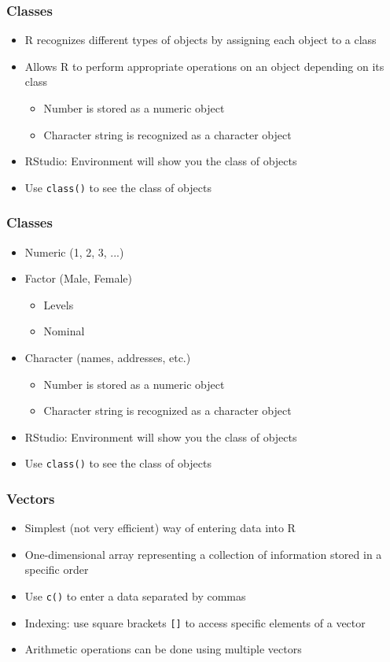 \documentclass{beamer}
\begin{document}
\begin{frame}
 \frametitle<+->{Classes}
 \begin{itemize}
   \item R recognizes different types of objects by assigning each object to a class
   \item Allows R to perform appropriate operations on an object depending on its class
     \begin{itemize}
       \item Number is stored as a numeric object
       \item Character string is recognized as a character object
     \end{itemize}
   \item RStudio: Environment will show you the class of objects
   \item Use {\tt class()} to see the class of objects
 \end{itemize}
\end{frame}

\begin{frame}
 \frametitle<+->{Classes}
 \begin{itemize}
   \item Numeric (1, 2, 3, ...)
   \item Factor (Male, Female)
    \begin{itemize}
       \item Levels
       \item Nominal
     \end{itemize}
   \item Character (names, addresses, etc.)
     \begin{itemize}
       \item Number is stored as a numeric object
       \item Character string is recognized as a character object
     \end{itemize}
   \item RStudio: Environment will show you the class of objects
   \item Use {\tt class()} to see the class of objects
 \end{itemize}
\end{frame}

\begin{frame}
 \frametitle<+->{Vectors}
 \begin{itemize}
   \item Simplest (not very efficient) way of entering data into R
   \item One-dimensional array representing a collection of information stored in a specific order
   \item Use {\tt c()} to enter a data separated by commas
   \item Indexing: use square brackets {\tt []} to access specific elements of a vector
   \item Arithmetic operations can be done using multiple vectors
 \end{itemize}
\end{frame}
\end{document}
